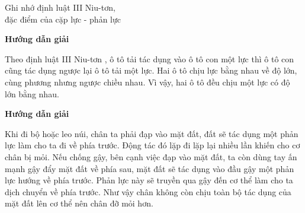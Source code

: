 \begin{dang}{Ghi nhớ định luật III Niu-tơn, \\đặc điểm của cặp lực - phản lực}
	{	\begin{center}
			\textbf{Hướng dẫn giải}
		\end{center}
		
		Theo định luật III Niu-tơn , ô tô tải tác dụng vào ô tô con một lực thì ô tô con cũng tác dụng ngược lại ô tô tải một lực. Hai ô tô chịu lực bằng nhau về độ lớn, cùng phương nhưng ngược chiều nhau. Vì vậy, hai ô tô đều chịu một lực có độ lớn bằng nhau.
		
	}
	{	\begin{center}
			\textbf{Hướng dẫn giải}
		\end{center}
		
		Khi đi bộ hoặc leo núi, chân ta phải đạp vào mặt đất, đất sẽ tác dụng một phản lực làm cho ta đi về phía trước. Động tác đó lặp đi lặp lại nhiều lần khiến cho cơ chân bị mỏi. Nếu chống gậy, bên cạnh việc đạp vào mặt đất, ta còn dùng tay ấn mạnh gậy đẩy mặt đất về phía sau, mặt đất sẽ tác dụng vào đầu gậy một phản lực hướng về phía trước. Phản lực này sẽ truyền qua gậy đến cơ thể làm cho ta dịch chuyển về phía trước. Như vậy chân không còn chịu toàn bộ tác dụng của mặt đất lên cơ thể nên chân đỡ mỏi hơn.
	}
\end{dang}

